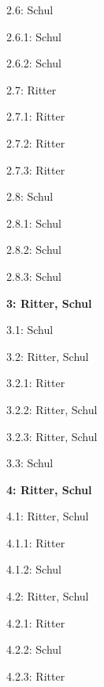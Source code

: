 \documentclass[12pt]{report}
\begin{document}
\begin{multicols}{2}
\begin{compactitem}
\begin{compactitem}
\item[] 2.6: Schul
\begin{compactitem}
\item[] 2.6.1: Schul
\item[] 2.6.2: Schul
\end{compactitem}

\item[] 2.7: Ritter
\begin{compactitem}
\item[] 2.7.1: Ritter
\item[] 2.7.2: Ritter
\item[] 2.7.3: Ritter
\end{compactitem}

\item[] 2.8: Schul
\begin{compactitem}
\item[] 2.8.1: Schul
\item[] 2.8.2: Schul
\item[] 2.8.3: Schul
\end{compactitem}
\end{compactitem}

\item[] \textbf{3: Ritter, Schul}
\begin{compactitem}
\item[] 3.1: Schul
\item[] 3.2: Ritter, Schul
\begin{compactitem}
\item[] 3.2.1: Ritter
\item[] 3.2.2: Ritter, Schul
\item[] 3.2.3: Ritter, Schul
\end{compactitem}
\item[] 3.3: Schul
\end{compactitem}

\item[] \textbf{4: Ritter, Schul}
\begin{compactitem}
\item[] 4.1: Ritter, Schul
\begin{compactitem}
\item[] 4.1.1: Ritter
\item[] 4.1.2: Schul
\end{compactitem}

\item[] 4.2: Ritter, Schul
\begin{compactitem}
\item[] 4.2.1: Ritter
\item[] 4.2.2: Schul
\item[] 4.2.3: Ritter
\end{compactitem}
\end{compactitem}


\end{compactitem}
\end{multicols}
\end{document}
